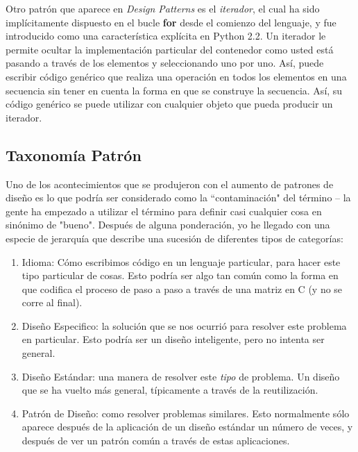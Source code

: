 Otro patrón que aparece en \textit{Design Patterns} es el \textit{iterador}, el cual ha sido implícitamente dispuesto en el bucle \textbf{for} desde el comienzo del lenguaje, y fue introducido como una característica explícita en Python 2.2. Un iterador le permite ocultar la implementación particular del contenedor como  usted está pasando a través de los elementos y seleccionando uno por uno. Así, puede escribir código genérico que realiza una operación en todos los elementos en una secuencia sin tener en cuenta la forma en que se construye la secuencia. Así, su código genérico se puede utilizar con cualquier objeto que pueda producir un iterador. \newline


\subsection*{Taxonomía Patrón}
\label{subsec:txp}

Uno de los acontecimientos que se produjeron con el aumento de patrones de diseño es lo que podría ser considerado como la ``contaminación" del término – la gente ha empezado a utilizar el término para definir 
casi cualquier cosa en sinónimo de "bueno". Después de alguna ponderación, yo he llegado con una especie de jerarquía que describe una sucesión de diferentes tipos de categorías:      
\begin{enumerate}
    
    \item{Idioma:} Cómo escribimos código en un lenguaje particular, para hacer este tipo particular de cosas. Esto podría ser algo tan común como la forma en que codifica el proceso de paso a paso a través de una matriz en C (y no se corre al final).
    
    \item{Diseño Especifico:} la solución que se nos ocurrió para resolver este problema en particular. Esto podría ser un diseño inteligente, pero no intenta ser general.
    
    \item{Diseño Estándar:} una manera de resolver este \textit{tipo} de problema. Un diseño que se ha vuelto más general, típicamente a través de la reutilización.
    
    \item{Patrón de Diseño:} como resolver problemas similares. Esto normalmente sólo aparece después de la aplicación de un diseño estándar un número de veces, y después de ver un patrón común a través de estas aplicaciones.
    
\end{enumerate}

